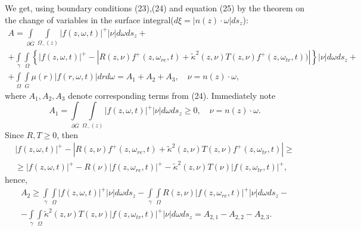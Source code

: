 \documentclass[12pt,reqno]{report}
\begin{document}
We get, using boundary conditions (23),(24) and equation (25) by the theorem  
on the change of variables in the surface integral($ d\xi =
|n(z) \cdot \omega| d s_z$):
\begin{multline}
A =
\int \limits_{\partial \overline{G}} \int \limits_{\Omega_-(z)}
|f(z,\omega,t)|^+ |\nu | d \omega d s_z
+
\\+
\int \limits_{\gamma} \int \limits_{\Omega} \left
\{|f(z,\omega,t)|^+ - |R(z,\nu ) f^+(z,\omega_{re},t) +
\widetilde{\kappa}^2(z,\nu )T(z,\nu )
f^+(z,\omega_{tr},t) ) | \right\} |\nu |d\omega d s_z +\\
+ \int \limits_{\Omega} \int
\limits_G \mu(r) |f(r,\omega,t)| dr d\omega =A_1 +A_2 +A_3, \quad
\nu = n(z)\cdot \omega,
\end{multline}
where $A_1, A_2, A_3$ denote corresponding terms from (24). Immediately note
\begin{equation}
A_1 = \int \limits_{\partial \overline{G}} \int
\limits_{\Omega_-(z)}
|f(z,\omega,t)|^+ |\nu | d \omega d
s_z \geq 0, \quad \nu = n(z)\cdot \omega.
\end{equation}
Since $R, T \geq 0$, then
\begin{multline}
|f(z,\omega,t)|^+ - |R(z,\nu ) f^+(z,\omega_{re},t) +
\widetilde{\kappa}^2(z,\nu )T(z,\nu ) f^+(z,\omega_{tr},t) | \geq \\
\geq | f (z,\omega,t)|^+ - R(\nu ) |f(z,\omega_{re},t)|^+ -
\widetilde{\kappa}^2(z,\nu )T(\nu ) |f(z,\omega_{tr},t) |^+,
\end{multline}
hence,
\begin{multline}
A_2 \geq \int \limits_{\gamma} \int \limits_{\Omega}| f
(z,\omega,t)|^+|\nu | d\omega d s_z -   \int \limits_{\gamma} \int \limits_{\Omega}  R(z,\nu ) |f(z,\omega_{re},t)|^+ |\nu |d\omega d s_z - \\- 
 \int \limits_{\gamma} \int \limits_{\Omega} \widetilde{\kappa}^2(z,\nu )T(z,\nu ) |f(z,\omega_{tr},t) |^+ 
|\nu |d\omega d s_z = A_{2,1}- A_{2,2} - A_{2,3}.
\end{multline}
\end{document}
